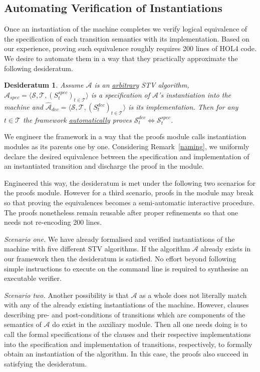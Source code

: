 \documentclass[10pt,conference]{IEEEtran}
\newtheorem{conjecture}{Desideratum}
\begin{document}
\subsection{Automating Verification of Instantiations}  
Once an instantiation of the machine  completes   
 we verify logical equivalence of the specification of each transition semantics with its  implementation. 
Based on our experience, proving  such equivalence  
roughly requires 200 lines of HOL4 code. 
We desire to automate them in a way that they practically approximate the following desideratum.    
 \begin{conjecture}\label{conj}
 Assume $\mathcal{A}$ is an \underline{arbitrary} STV algorithm, $\hat{\mathcal{A}}_{spec}= \langle \mathcal{S}, \mathcal{T}, (S_{t}^{spec})_{t \in \mathcal{T}} \rangle$ is a specification of $\mathcal{A}$'s instantiation into the machine and $\hat{\mathcal{A}}_{dec}= \langle \mathcal{S}, \mathcal{T}, (S_{t}^{dec})_{t \in \mathcal{T}} \rangle$ is its implementation. 
  Then for any $t\in\mathcal{T}$ the framework \underline{automatically} proves  $\mathcal{S}_{t}^{dec}\Leftrightarrow\mathcal{S}_{t}^{spec}$. 
 \end{conjecture}
We engineer the framework in a way that the proofs module calls instantiation modules as its parents  one by one.
 Considering Remark~\ref{naming},   we uniformly declare the desired equivalence between the specification and implementation of an instantiated transition and discharge the proof in the  module.


Engineered this way, the desideratum is met under the following two scenarios for the proofs module. However for a third scenario, proofs in the module may break so that proving the equivalences  becomes a semi-automatic interactive procedure. The proofs nonetheless remain reusable after proper refinements so that one needs not re-encoding 200 lines.  

\emph{Scenario one.} We have already formalised and verified instantiations of the machine with five different STV algorithms. If the algorithm $\mathcal{A}$ already exists in our framework then the desideratum is satisfied. No effort beyond following simple instructions to execute on the command line is required to synthesise an executable verifier.  

\emph{Scenario two.} Another possibility is that 
 $\mathcal{A}$ as a whole does not literally match with any of the
 already existing instantiations of the machine. However, clauses
 describing pre- and post-conditions of transitions which are
 components of the semantics of $\mathcal{A}$ do exist in the
 auxiliary module. Then all one needs doing is to call the formal
 specifications of the clauses and their respective implementations
 into the specification and implementation of transitions,
 respectively,  to formally obtain an instantiation of the
 algorithm. In this case, the proofs also succeed in satisfying the
 desideratum. 
\end{document}
